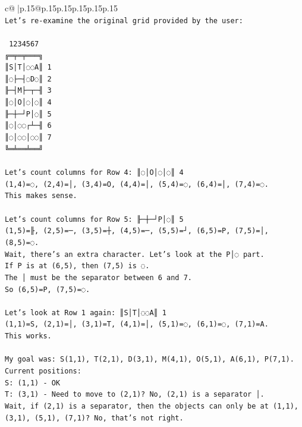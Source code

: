 \documentclass{article}
\begin{document}
{\begin{supertabular}{c@{$\;$}|p{.15\linewidth}@{}p{.15\linewidth}p{.15\linewidth}p{.15\linewidth}p{.15\linewidth}p{.15\linewidth}}
{{{\\ 
\texttt{Let's re{-}examine the original grid provided by the user:} \\
\\ 
\texttt{ 1234567} \\
\texttt{╔═╤═╤═══╗} \\
\texttt{║S│T│◌◌A║ 1} \\
\texttt{║◌├─┤◌D◌║ 2} \\
\texttt{╟─┤M├─┬─╢ 3} \\
\texttt{║◌│O│◌│◌║ 4} \\
\texttt{╟─┼─┘P│◌║ 5} \\
\texttt{║◌│◌◌┌┴─╢ 6} \\
\texttt{║◌│◌◌│◌◌║ 7} \\
\texttt{╚═╧══╧══╝} \\
\\ 
\texttt{Let's count columns for Row 4: ║◌│O│◌│◌║ 4} \\
\texttt{(1,4)=◌, (2,4)=│, (3,4)=O, (4,4)=│, (5,4)=◌, (6,4)=│, (7,4)=◌.} \\
\texttt{This makes sense.} \\
\\ 
\texttt{Let's count columns for Row 5: ╟─┼─┘P│◌║ 5} \\
\texttt{(1,5)=╟, (2,5)=─, (3,5)=┼, (4,5)=─, (5,5)=┘, (6,5)=P, (7,5)=│, (8,5)=◌.} \\
\texttt{Wait, there's an extra character. Let's look at the P│◌ part.} \\
\texttt{If P is at (6,5), then (7,5) is ◌.} \\
\texttt{The │ must be the separator between 6 and 7.} \\
\texttt{So (6,5)=P, (7,5)=◌.} \\
\\ 
\texttt{Let's look at Row 1 again: ║S│T│◌◌A║ 1} \\
\texttt{(1,1)=S, (2,1)=│, (3,1)=T, (4,1)=│, (5,1)=◌, (6,1)=◌, (7,1)=A.} \\
\texttt{This works.} \\
\\ 
\texttt{My goal was: S(1,1), T(2,1), D(3,1), M(4,1), O(5,1), A(6,1), P(7,1).} \\
\texttt{Current positions:} \\
\texttt{S: (1,1) {-} OK} \\
\texttt{T: (3,1) {-} Need to move to (2,1)? No, (2,1) is a separator │.} \\
\texttt{Wait, if (2,1) is a separator, then the objects can only be at (1,1), (3,1), (5,1), (7,1)? No, that's not right.} \\
}}}
\end{supertabular}}
\end{document}
